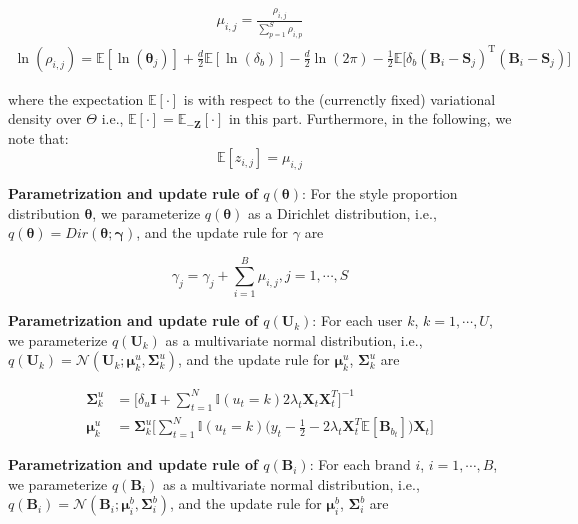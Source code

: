 \begin{align}
\mu_{i,j} =  \frac{\rho_{i,j}}{\sum_{p=1}^S\rho_{i,p}} 
\end{align}
\begin{align}
\ln(\rho_{i,j}) =  \mathbb{E}[\ln(\bm{\theta}_j)]+\frac{d}{2}\mathbb{E}[\ln(\delta_b)]-\frac{d}{2}\ln(2\pi) 
 -\frac{1}{2}\mathbb{E}\big[\delta_b(\mathbf{B}_i-\mathbf{S}_j)^\mathrm{T}(\mathbf{B}_i-\mathbf{S}_j)\big]
\end{align}

\noindent where the expectation $\mathbb{E}[\cdot]$ is with respect to the (currenctly fixed) variational density over $\Theta$  i.e., $\mathbb{E}[\cdot]=\mathbb{E}_{-\bm{Z}}[\cdot]$ in this part. Furthermore, in the following, we note that: 
\begin{equation}
\label{eq:hidden}
\mathbb{E}[z_{i,j}]=\mu_{i,j}
\end{equation}

\noindent \textbf{Parametrization and update rule of $q(\mathbf{\theta})$}:
For the style proportion distribution $\mathbf{\theta}$, we parameterize $q(\mathbf{\theta})$ as a Dirichlet distribution, i.e., $q(\mathbf{\theta}) = Dir(\mathbf{\theta}; \mathbf{\gamma})$, and the update rule for $\gamma$ are 

\begin{equation}
\label{eq:start}
\gamma_j = \gamma_j + \sum_{i=1}^B \mu_{i,j}, j=1,\cdots,S
\end{equation}



\noindent \textbf{Parametrization and update rule of $q(\mathbf{U}_k)$}:
For each user $k$, $k = 1, \cdots, U$, we parameterize $q(\mathbf{U}_k)$ as a multivariate normal distribution, i.e., $q(\mathbf{U}_k) = \mathcal{N}(\mathbf{U}_k; \bm{\mu}^u_k, \bm{\Sigma}_k^u)$, and the update rule for $\bm{\mu}^u_k$, $\bm{\Sigma}_k^u$ are 

\begin{align}
\bm{\Sigma}_k^u & = \big[  \delta_u \mathbf{I} + \sum_{t=1}^N \mathbb{I}(u_t = k) 2\lambda_t \mathbf{X}_t \mathbf{X}_t^T  \big]^{-1} \\ 
\bm{\mu}^u_k & = \bm{\Sigma}_k^u\Big[  \sum_{t=1}^N\mathbb{I}(u_t=k)  \big(y_t-\frac{1}{2}-2\lambda_{t}\mathbf{X}_t^T\mathbb{E}[\mathbf{B}_{b_t}]\big)\mathbf{X}_t \Big]
\end{align}

\noindent \textbf{Parametrization and update rule of $q(\mathbf{B}_i)$}:
For each brand $i$, $i = 1, \cdots, B$, we parameterize $q(\mathbf{B}_i)$ as a multivariate normal distribution, i.e., $q(\mathbf{B}_i) = \mathcal{N}(\mathbf{B}_i; \bm{\mu}^b_i, \bm{\Sigma}^b_i)$, and the update rule for $\bm{\mu}^b_i$, $\bm{\Sigma}^b_i$ are 

